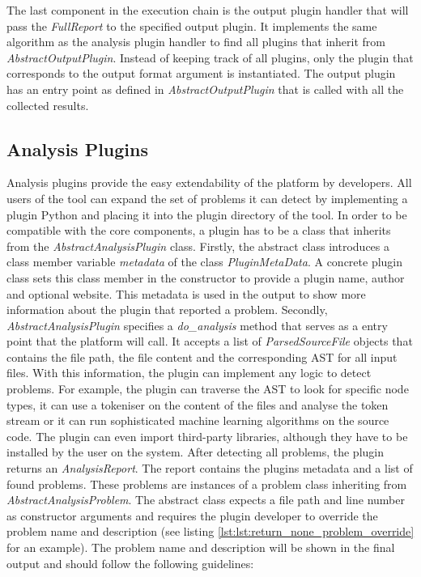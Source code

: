 The last component in the execution chain is the output plugin handler that will pass the \textit{FullReport} to the specified output plugin. It implements the same algorithm as the analysis plugin handler to find all plugins that inherit from \textit{AbstractOutputPlugin}. Instead of keeping track of all plugins, only the plugin that corresponds to the output format argument is instantiated. The output plugin has an entry point as defined in \textit{AbstractOutputPlugin}  that is called with all the collected results.

\subsection{Analysis Plugins}\label{sec:analysis_plugins}
Analysis plugins provide the easy extendability of the platform by developers. All users of the tool can expand the set of problems it can detect by implementing a plugin Python and placing it into the plugin directory of the tool. In order to be compatible with the core components, a plugin has to be a class that inherits from the \textit{AbstractAnalysisPlugin} class. Firstly, the abstract class introduces a class member variable \textit{metadata} of the class \textit{PluginMetaData}. A concrete plugin class sets this class member in the constructor to provide a plugin name, author and optional website. This metadata is used in the output to show more information about the plugin that reported a problem. Secondly, \textit{AbstractAnalysisPlugin} specifies a \textit{do\_analysis} method that serves as a entry point that the platform will call. It accepts a list of \textit{ParsedSourceFile} objects that contains the file path, the file content and the corresponding AST for all input files. With this information, the plugin can implement any logic to detect problems. 
For example, the plugin can traverse the AST to look for specific node types, it can use a tokeniser on the content of the files and analyse the token stream or it can run sophisticated machine learning algorithms on the source code.
The plugin can even import third-party libraries, although they have to be installed by the user on the system. After detecting all problems, the plugin returns an \textit{AnalysisReport}. The report contains the plugins metadata and a list of found problems. These problems are instances of a problem class inheriting from \textit{AbstractAnalysisProblem}. The abstract class expects a file path and line number as constructor arguments and requires the plugin developer to override the problem name and description (see listing \ref{lst:lst:return_none_problem_override} for an example). The problem name and description will be shown in the final output and should follow the following guidelines:

